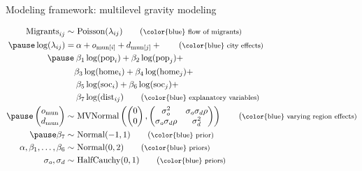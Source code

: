 \documentclass{beamer}
\begin{document}
\begin{frame}[fragile]{Modeling framework: multilevel gravity modeling}
\begin{small}
	\begin{align} \text{Migrants}_{ij} \sim & \text{ Poisson}(\lambda_{ij}) \tag{\footnotesize \color{blue} flow of migrants} \\ \pause
	\log(\lambda_{ij}) =
	& \: \alpha + o_{\text{mun}[i]} + d_{\text{mun}[j]} + \tag{\footnotesize
   \color{blue} city effects}  \\ \pause
	& \: \beta_1 \log(\text{pop}_i) + \notag
	\beta_2\log(\text{pop}_j) + \notag \\ & \beta_3
	\log(\text{home}_i) + \beta_4 \log(\text{home}_j) + \notag\\
	& \: \beta_5 \log(\text{soc}_i) + \beta_6 \log(\text{soc}_j) + \notag \\ 
	& \: \beta_7 \log(\text{dist}_{ij})  \tag{\footnotesize \color{blue} explanatory variables}  \\ \pause
	\left(\begin{matrix} 
	o_{\text{mun}} \\
	d_{\text{mun}}
	\end{matrix}\right) \sim& \text{ MVNormal}\left( \left( \begin{matrix}
	0 \\
	0 
	\end{matrix}\right) , \left(\begin{matrix}
	\sigma_o^2 & \sigma_o \sigma_d \rho \\
	 \sigma_o \sigma_d \rho  & \sigma_d^2
	\end{matrix}\right) \right)  \tag{\footnotesize \color{blue} varying region effects}  \\ \pause
			\beta_7 \sim& \text{ Normal}(-1,1) \tag{\footnotesize \color{blue} prior} \\ 
	\alpha, \beta_1,\ldots, \beta_6 \sim& \text{
		Normal}(0,2) \tag{\footnotesize \color{blue} priors} \\ 
	\sigma_o, \sigma_d \sim& \text{ HalfCauchy}(0,1) \tag{\footnotesize \color{blue} priors} 
	\end{align}
\end{small}
\end{frame}
\end{document}
